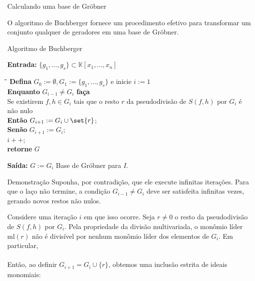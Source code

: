 \begin{frame}[t]{Calculando uma base de Gröbner}

O algoritmo de Buchberger fornece um procedimento efetivo para transformar um conjunto qualquer de geradores em uma base de Gröbner.

\begin{algbox}{Algoritmo de Buchberger}

\textbf{Entrada:}
\quad $\{g_1,\ldots,g_s\}\subset\mathbb{K}[x_1,\ldots,x_n]$


\medskip

\begin{tabbing}
\qquad\=\qquad\=\qquad\=\kill
\textbf{Defina} $G_0:= \emptyset,G_1:= \{g_1,\ldots,g_s\}$ e inicie $i:=1$\\
\textbf{Enquanto} $G_{i-1} \neq G_i$ \textbf{faça}\\
\> Se existirem $f,h\in G_i$ tais que o resto $r$ da pseudodivisão de $S(f,h)$ por $G_i$ é não nulo\\
\> \> \textbf{Então} $G_{i+1}:=G_i \cup \set{r}$;\\
\> \> \textbf{Senão} $G_{i+1}:=G_i$;\\
\> $i++$;\\
\textbf{retorne} $G$
\end{tabbing}

\textbf{Saída:}
\quad $G:=G_i$ Base de Gröbner para $I$.
\end{algbox}
\end{frame}

\begin{frame}{Demonstração}
    Suponha, por contradição, que ele execute infinitas iterações. Para que o laço não termine, a condição $G_{i-1} \neq G_i$ deve ser satisfeita infinitas vezes, gerando novos restos não nulos.

Considere uma iteração $i$ em que isso ocorre. Seja $r \neq 0$ o resto da pseudodivisão de $S(f,h)$ por $G_i$. Pela propriedade da divisão multivariada, o monômio líder $\mathrm{ml}(r)$ não é divisível por nenhum monômio líder dos elementos de $G_i$. Em particular,\\
\centering {}
\pause
\vspace{5mm}
\\\noindent Então, ao definir $G_{i+1}=G_i\cup\{r\}$, obtemos uma inclusão estrita de ideais monomiais:
\centering {}

\end{frame}

